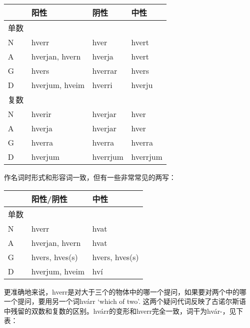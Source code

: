 \begin{longtable}{llll}
    \toprule
         & 阳性           & 阴性     & 中性     \\
    \midrule
    \endhead
    \bottomrule
    \endfoot
    单数 &                &          &          \\
    N    & hverr          & hver     & hvert    \\
    A    & hverjan, hvern & hverja   & hvert    \\
    G    & hvers          & hverrar  & hvers    \\
    D    & hverjum, hveim & hverri   & hverju   \\
    复数 &                &          &          \\
    N    & hverir         & hverjar  & hver     \\
    A    & hverja         & hverjar  & hver     \\
    G    & hverra         & hverra   & hverra   \\
    D    & hverjum        & hverrjum & hverrjum \\
\end{longtable}

作名词时形式和形容词一致，但有一些非常常见的两写：

\begin{longtable}{lll}
    \toprule
         & 阳性/阴性      & 中性           \\
    \midrule
    \endhead
    \bottomrule
    \endfoot
    单数 &                &                \\
    N    & hverr          & hvat           \\
    A    & hverjan, hvern & hvat           \\
    G    & hvers, hves(s) & hvers, hves(s) \\
    D    & hverjum, hveim & hví            \\
\end{longtable}

更准确地来说，hverr是对大于三个的物体中的哪一个提问，如果要对两个中的哪一个提问，要用另一个词hvárr `which of two‌'.
这两个疑问代词反映了古诺尔斯语中残留的双数和复数的区别。hvárr的变形和hverr完全一致，词干为hvár-，见下表：

